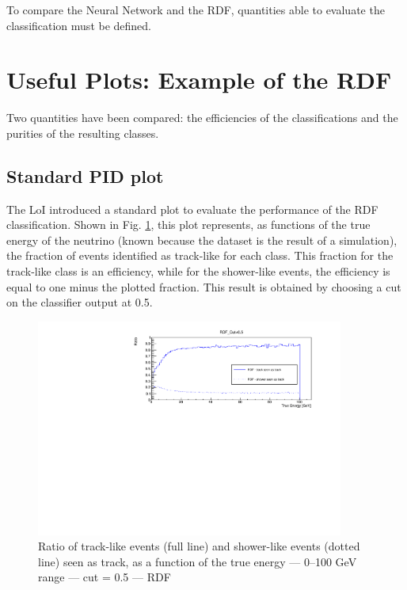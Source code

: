 To compare the Neural Network and the RDF, quantities able to evaluate the classification must be defined.

\section{Useful Plots: Example of the RDF}

Two quantities have been compared: the efficiencies of the classifications and the purities of the resulting classes.

\subsection{Standard PID plot}

\qquad The LoI \citep{Adrian-Martinez:2016fdl} introduced a standard plot to evaluate the performance of the RDF classification. Shown in Fig. \ref{fig:JYVHJ}, this plot represents, as functions of the true energy of the neutrino (known because the dataset is the result of a simulation), the fraction of events identified as track-like for each class. This fraction for the track-like class is an efficiency, while for the shower-like events, the efficiency is equal to one minus the plotted fraction. This result is obtained by choosing a cut on the classifier output at 0.5.

\begin{figure}[h!]
    \centering
    \includegraphics[width=0.9\textwidth]{fig/PID_Efficiency_RDF_CUT_0_5_E_cut_100.pdf}
    \caption{Ratio of track-like events (full line) and shower-like events (dotted line) seen as track, as a function of the true energy --- 0--100 GeV range --- cut = 0.5 --- RDF}
    \label{fig:JYVHJ}
\end{figure}

